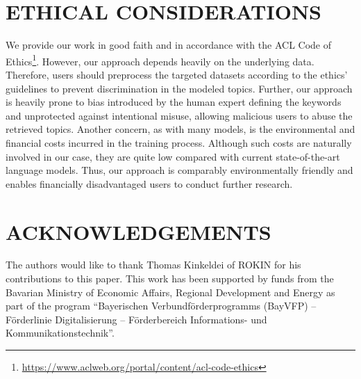 \documentclass[a4paper,twoside]{article}
\begin{document}
\section{\uppercase{Ethical Considerations}}
\label{sec:ethical_considerations}

We provide our work in good faith and in accordance with the ACL Code of Ethics\footnote{\href{https://www.aclweb.org/portal/content/acl-code-ethics}{https://www.aclweb.org/portal/content/acl-code-ethics}}. However, our approach depends heavily on the underlying data. Therefore, users should preprocess the targeted datasets according to the ethics' guidelines to prevent discrimination in the modeled topics. Further, our approach is heavily prone to bias introduced by the human expert defining the keywords and unprotected against intentional misuse, allowing malicious users to abuse the retrieved topics. Another concern, as with many models, is the environmental and financial costs incurred in the training process. Although such costs are naturally involved in our case, they are quite low compared with current state-of-the-art language models. Thus, our approach is comparably environmentally friendly and enables financially disadvantaged users to conduct further research.

\section*{ACKNOWLEDGEMENTS}
\label{sec:acknowledgments}

The authors would like to thank Thomas Kinkeldei of ROKIN for his contributions to this paper. \newline
This work has been supported by funds from the Bavarian Ministry of Economic Affairs, Regional Development and Energy as part of the program “Bayerischen Verbundförderprogramms (BayVFP) – Förderlinie Digitalisierung – Förderbereich Informations- und Kommunikationstechnik”.


{\small
}
\end{document}
